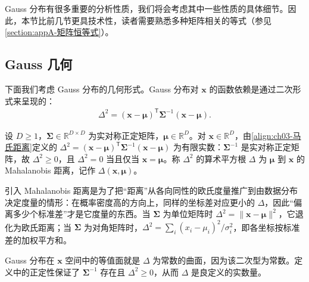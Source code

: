 \documentclass[../../main.tex]{subfiles}
\begin{document}
Gauss 分布有很多重要的分析性质，我们将会考虑其中一些性质的具体细节。因此，本节比前几节更具技术性，读者需要熟悉多种矩阵相关的等式（参见\cref{section:appA-矩阵恒等式}）。

\subsection{Gauss 几何}\label{subsection:ch03-Gauss几何}

下面我们考虑 Gauss 分布的几何形式。Gauss 分布对 $\boldsymbol{x}$ 的函数依赖是通过二次形式来呈现的：
\begin{align}
\Delta^{2}=(\boldsymbol{x}-\boldsymbol{\mu})^{\mathsf{T}}\boldsymbol{\Sigma}^{-1}(\boldsymbol{x}-\boldsymbol{\mu}).
\label{align:ch03-马氏距离}
\end{align}

\begin{definition}[Mahalanobis 距离]\label{definition:ch03-马氏距离}
设 $D\geqslant1$，$\boldsymbol{\Sigma}\in\mathbb{R}^{D\times D}$ 为实对称正定矩阵，$\boldsymbol{\mu}\in\mathbb{R}^{D}$。对 $\boldsymbol{x}\in\mathbb{R}^{D}$，由\eqref{align:ch03-马氏距离}定义的 $\Delta^{2}=(\boldsymbol{x}-\boldsymbol{\mu})^{\mathsf{T}}\boldsymbol{\Sigma}^{-1}(\boldsymbol{x}-\boldsymbol{\mu})$ 为有限实数：$\boldsymbol{\Sigma}^{-1}$ 是实对称正定矩阵，故 $\Delta^{2}\geqslant0$，且 $\Delta^{2}=0$ 当且仅当 $\boldsymbol{x}=\boldsymbol{\mu}$。称 $\Delta^{2}$ 的算术平方根 $\Delta$ 为 $\boldsymbol{\mu}$ 到 $\boldsymbol{x}$ 的 Mahalanobis 距离，记作 $\Delta(\boldsymbol{x},\boldsymbol{\mu})$。
\end{definition}

\begin{remark}
引入 Mahalanobis 距离是为了把“距离”从各向同性的欧氏度量推广到由数据分布决定度量的情形：在概率密度高的方向上，同样的坐标差对应更小的 $\Delta$，因此“偏离多少个标准差”才是它度量的东西。当 $\boldsymbol{\Sigma}$ 为单位矩阵时 $\Delta^{2}=\lVert\boldsymbol{x}-\boldsymbol{\mu}\rVert^{2}$，它退化为欧氏距离；当 $\boldsymbol{\Sigma}$ 为对角矩阵时，$\Delta^{2}=\sum_{i}(x_i-\mu_i)^{2}/\sigma_i^{2}$，即各坐标按标准差的加权平方和。

Gauss 分布在 $\boldsymbol{x}$ 空间中的等值面就是 $\Delta$ 为常数的曲面，因为该二次型为常数。定义中的正定性保证了 $\boldsymbol{\Sigma}^{-1}$ 存在且 $\Delta^{2}\geqslant0$，从而 $\Delta$ 是良定义的实数量。
\end{remark}
\end{document}
